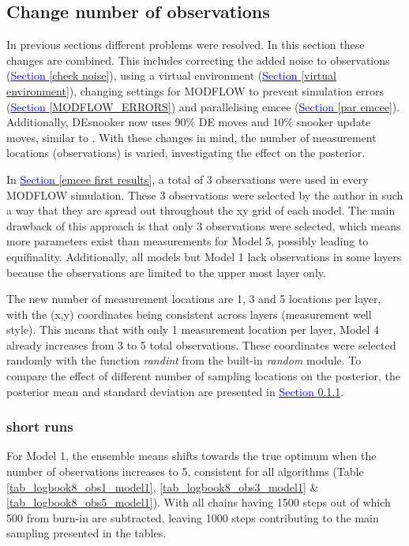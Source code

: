 \subsection{Change number of observations}\label{nr obs}
In previous sections different problems were resolved. In this section these changes are combined. This includes correcting the added noise to observations (\hyperref[check noise]{\textcolor{blue}{Section }\ref{check noise}}), using a virtual environment (\hyperref[virtual environment]{\textcolor{blue}{Section }\ref{virtual environment}}), changing settings for MODFLOW to prevent simulation errors (\hyperref[MODFLOW_ERRORS]{\textcolor{blue}{Section }\ref{MODFLOW_ERRORS}}) and parallelising emcee (\hyperref[par emcee]{\textcolor{blue}{Section }\ref{par emcee}}). Additionally, DEsnooker now uses 90\% DE moves and 10\% snooker update moves, similar to \cite{terbraak2008differential}. With these changes in mind, the number of measurement locations (observations) is varied, investigating the effect on the posterior.  

In \hyperref[emcee first results]{\textcolor{blue}{Section }\ref{emcee first results}}, a total of 3 observations were used in every MODFLOW simulation. These 3 observations were selected by the author in such a way that they are spread out throughout the xy grid of each model. The main drawback of this approach is that only 3 observations were selected, which means more parameters exist than measurements for Model 5, possibly leading to equifinality. Additionally, all models but Model 1 lack observations in some layers because the observations are limited to the upper most layer only.

The new number of measurement locations are 1, 3 and 5 locations per layer, with the (x,y) coordinates being consistent across layers (measurement well style). This means that with only 1 measurement location per layer, Model 4 already increases from 3 to 5 total observations. These coordinates were selected randomly with the function \textit{randint} from the built-in \textit{random} module. To compare the effect of different number of sampling locations on the posterior, the posterior mean and standard deviation are presented in \hyperref[log8 mean]{\textcolor{blue}{Section }\ref{log8 mean}}.

\subsubsection{short runs}\label{log8 mean}
For Model 1, the ensemble means shifts towards the true optimum when the number of observations increases to 5, consistent for all algorithms (Table \ref{tab_logbook8_obs1_model1}, \ref{tab_logbook8_obs3_model1} \& \ref{tab_logbook8_obs5_model1}). With all chains having 1500 steps out of which 500 from burn-in are subtracted, leaving 1000 steps contributing to the main sampling presented in the tables. 

